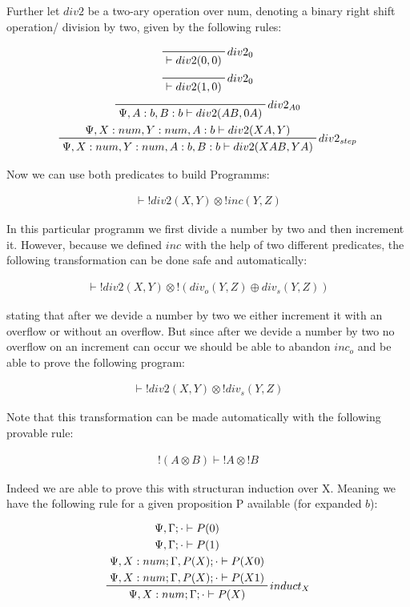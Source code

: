 \documentclass[sigconf]{acmart}
\begin{document}
Further let $div2$ be a two-ary operation over num, denoting a binary right shift operation/ division by two, given by the following rules:

\begin{gather*}
  \prftree[r]
    {$div2_0$}
    {\vdash div2(0, 0)}
    \\
  \prftree[r]
    {$div2_0$}
    {\vdash div2(1, 0)}\\
  \prftree[r]
    {$div2_{A0}$}
    {\Psi, A:b, B:b\vdash div2(AB, 0A)}
    \\
  \prftree[r]
    {$div2_{step}$}
    {\Psi, X:num, Y:num, A:b\vdash div2(XA, Y)}
    {\Psi, X:num, Y:num, A:b, B:b\vdash div2(XAB, YA)}
\end{gather*}

Now we can use both predicates to build Programms:

\begin{eqnarray}
  \vdash !div2(X, Y)\otimes !inc(Y, Z)
\end{eqnarray}

In this particular programm we first divide a number by two and then increment it. However, because we defined $inc$ with the help of two different predicates, the following transformation can be done safe and automatically:

\begin{eqnarray}
  \vdash !div2(X, Y) \otimes !(div_o(Y, Z)\oplus div_s(Y, Z))
\end{eqnarray}

stating that after we devide a number by two we either increment it with an overflow or without an overflow. But since after we devide a number by two no overflow on an increment can occur we should be able to abandon $inc_o$ and be able to prove the following program:

\begin{eqnarray}
  \vdash !div2(X, Y)\otimes !div_s(Y, Z)
\end{eqnarray}

Note that this transformation can be made automatically with the following provable rule:

\begin{eqnarray}
  !(A\otimes B) \vdash !A \otimes !B
\end{eqnarray}

Indeed we are able to prove this with structuran induction over X. Meaning we have the following rule for a given proposition P available (for expanded $b$):

\begin{equation}
  \prftree[r]
    {$induct_X$}
    {
      \prftree[noline]
      {
        \prftree[noline]
        {\Psi, \Gamma;\cdot\vdash P(0)}
        {\Psi, \Gamma;\cdot\vdash P(1)}
      }
      {
        \prftree[noline]
        {\Psi, X:num; \Gamma, P(X);\cdot\vdash P(X 0)}
        {\Psi, X:num; \Gamma, P(X);\cdot\vdash P(X 1)}
      }
    }
    {\Psi, X:num; \Gamma;\cdot\vdash P(X)}
\end{equation}
\end{document}
